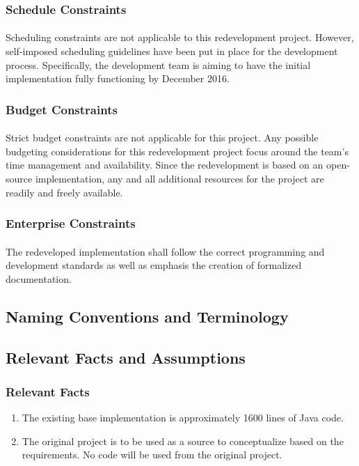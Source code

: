 \documentclass[12pt, titlepage]{article}
\begin{document}
\subsubsection{Schedule Constraints}
\paragraph{}
Scheduling constraints are not applicable to this redevelopment project. However, self-imposed scheduling guidelines have been put in place for the development process. Specifically, the development team is aiming to have the initial implementation fully functioning by December 2016.

\subsubsection{Budget Constraints}
\paragraph{}
Strict budget constraints are not applicable for this project. Any possible budgeting considerations for this redevelopment project focus around the team's time management and availability. Since the redevelopment is based on an open-source implementation, any and all additional resources for the project are readily and freely available.

\subsubsection{Enterprise Constraints}
\paragraph{}
The redeveloped implementation shall follow the correct programming and development standards as well as emphasis the creation of formalized documentation.

\subsection{Naming Conventions and Terminology}

\subsection{Relevant Facts and Assumptions}

\subsubsection{Relevant Facts}
\begin{enumerate}[i]
\item The existing base implementation is approximately 1600 lines of Java code.
\item The original project is to be used as a source to conceptualize based on the requirements. No code will be used from the original project.
\end{enumerate}
\end{document}
